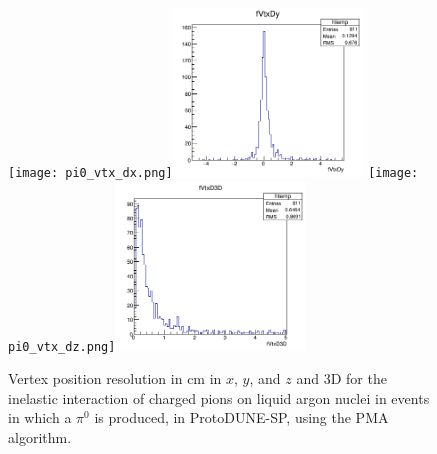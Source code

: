 \begin{figure}[htb]
\centering
\texttt{[image: pi0\_vtx\_dx.png]}\includegraphics[width=0.45\textwidth]{figures/pi0_vtx_dy.png}
\texttt{[image: pi0\_vtx\_dz.png]}\includegraphics[width=0.45\textwidth]{figures/pi0_vtx3d.png}
\caption{Vertex position resolution in cm in $x$, $y$, and $z$ and 3D for the
  inelastic interaction of charged pions on liquid argon nuclei in events in which a $\pi^0$ is produced, in
  ProtoDUNE-SP, using the PMA algorithm.}
\label{fig:PMApioninteraction}
\end{figure}
